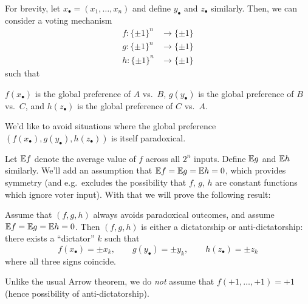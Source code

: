 For brevity, let $x_\bullet = (x_1, \dots, x_n)$
and define $y_\bullet$ and $z_\bullet$ similarly.
Then, we can consider a voting mechanism
\begin{align*}
	f \colon \{\pm1\}^n &\to \{\pm1\} \\
	g \colon \{\pm1\}^n &\to \{\pm1\} \\
	h \colon \{\pm1\}^n &\to \{\pm1\}
\end{align*}
such that
\begin{itemize}
	\ii $f(x_\bullet)$ is the global preference of $A$ vs.\ $B$,
	\ii $g(y_\bullet)$ is the global preference of $B$ vs.\ $C$,
	\ii and $h(z_\bullet)$ is the global preference of $C$ vs.\ $A$.
\end{itemize}
We'd like to avoid situations where the global preference
$(f(x_\bullet), g(y_\bullet), h(z_\bullet))$ is itself paradoxical.

Let $\mathbb E f$ denote the average value of $f$ across all $2^n$ inputs.
Define $\mathbb E g$ and $\mathbb E h$ similarly.
We'll add an assumption that $\mathbb E f = \mathbb E g = \mathbb E h = 0$,
which provides symmetry
(and e.g.\ excludes the possibility that $f$, $g$, $h$
are constant functions which ignore voter input).
With that we will prove the following result:
\begin{theorem}
	Assume that $(f,g,h)$ always avoids paradoxical outcomes,
	and assume $\mathbb E f = \mathbb E g = \mathbb E h = 0$.
	Then $(f,g,h)$ is either a dictatorship or anti-dictatorship:
	there exists a ``dictator'' $k$ such that
	\[ f(x_\bullet) = \pm x_k, \qquad g(y_\bullet) = \pm y_k,
		\qquad h(z_\bullet) = \pm z_k \]
	where all three signs coincide.
\end{theorem}
Unlike the usual Arrow theorem, we do \emph{not} assume
that $f(+1, \dots, +1) = +1$ (hence possibility of anti-dictatorship).


